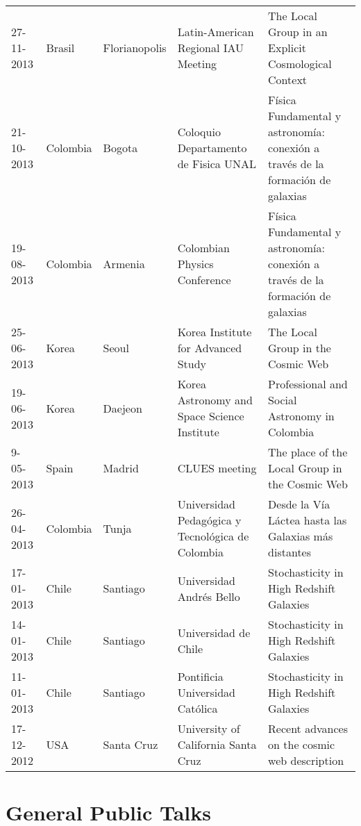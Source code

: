 \documentclass[letterpaper,11pt,onecolumn]{article}
\begin{document}
\begin{tabular}{p{2.0cm} p{1.5cm} p{1.5cm} p{4.5cm} p{6.0cm}}
27-11-2013 & Brasil & Floriano\-polis & Latin-American Regional IAU Meeting & The Local Group in an Explicit Cosmological Context\\
21-10-2013 & Colombia & Bogota & Coloquio Departamento de Fisica UNAL & F\'isica Fundamental y astronom\'ia: conexi\'on a trav\'es de la formaci\'on de galaxias\\
19-08-2013 & Colombia & Armenia & Colombian Physics Conference & F\'isica Fundamental y astronom\'ia: conexi\'on a trav\'es de la formaci\'on de galaxias\\
25-06-2013 & Korea & Seoul & Korea Institute for Advanced Study & The Local Group in the Cosmic Web\\
19-06-2013 & Korea & Daejeon & Korea Astronomy and Space Science Institute & Professional and Social Astronomy in Colombia\\
9-05-2013 & Spain & Madrid & CLUES meeting & The place of the Local Group in the Cosmic Web\\
26-04-2013 & Colombia & Tunja & Universidad Pedag\'ogica y
Tecnol\'ogica de Colombia & Desde la V\'ia L\'actea hasta las Galaxias
m\'as distantes\\
17-01-2013 & Chile & Santiago  & Universidad Andr\'es Bello &
Stochasticity in High Redshift Galaxies\\
14-01-2013 & Chile & Santiago  & Universidad de Chile&
Stochasticity in High Redshift Galaxies\\
11-01-2013 & Chile & Santiago  & Pontificia Universidad Cat\'olica&
Stochasticity in High Redshift Galaxies\\
17-12-2012 & USA & Santa Cruz & University of California Santa
Cruz & Recent advances on the cosmic web description  
\end{tabular}

\section*{General Public Talks}
\end{document}
